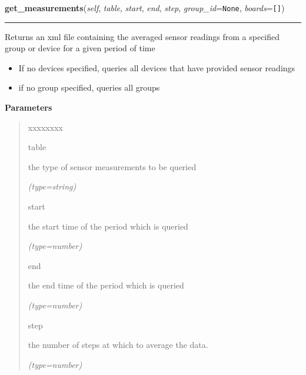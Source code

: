 \hspace{.8\funcindent}\begin{boxedminipage}{\funcwidth}

    \raggedright \textbf{get\_measurements}(\textit{self}, \textit{table}, \textit{start}, \textit{end}, \textit{step}, \textit{group\_id}={\tt None}, \textit{boards}={\tt []})

    \vspace{-1.5ex}

    \rule{\textwidth}{0.5\fboxrule}
\setlength{\parskip}{2ex}
    Returns an xml file containing the averaged sensor readings from a 
    specified group or device for a given period of time

    \begin{itemize}
    \setlength{\parskip}{0.6ex}
      \item If no devices specified, queries all devices that have provided 
        sensor readings

      \item if no group specified, queries all groups

    \end{itemize}

\setlength{\parskip}{1ex}
      \textbf{Parameters}
      \vspace{-1ex}

      \begin{quote}
        \begin{Ventry}{xxxxxxxx}

          \item[table]

          the type of sensor measurements to be queried

            {\it (type=string)}

          \item[start]

          the start time of the period which is queried

            {\it (type=number)}

          \item[end]

          the end time of the period which is queried

            {\it (type=number)}

          \item[step]

          the number of steps at which to average the data.

            {\it (type=number)}


\end{Ventry}
\end{quote}
\end{boxedminipage}
